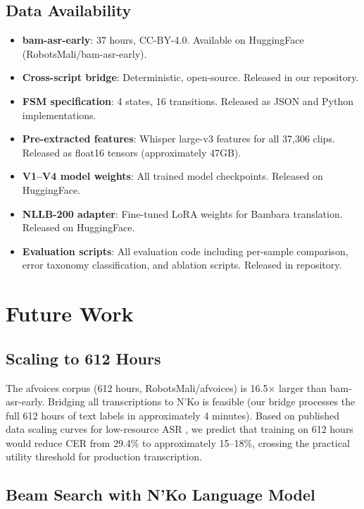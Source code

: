 \documentclass[11pt]{article}
\begin{document}
\subsection{Data Availability}

\begin{itemize}
\item \textbf{bam-asr-early}: 37 hours, CC-BY-4.0. Available on HuggingFace (RobotsMali/bam-asr-early).
\item \textbf{Cross-script bridge}: Deterministic, open-source. Released in our repository.
\item \textbf{FSM specification}: 4 states, 16 transitions. Released as JSON and Python implementations.
\item \textbf{Pre-extracted features}: Whisper large-v3 features for all 37,306 clips. Released as float16 tensors (approximately 47GB).
\item \textbf{V1--V4 model weights}: All trained model checkpoints. Released on HuggingFace.
\item \textbf{NLLB-200 adapter}: Fine-tuned LoRA weights for Bambara translation. Released on HuggingFace.
\item \textbf{Evaluation scripts}: All evaluation code including per-sample comparison, error taxonomy classification, and ablation scripts. Released in repository.
\end{itemize}

\section{Future Work}

\subsection{Scaling to 612 Hours}

The afvoices corpus (612 hours, RobotsMali/afvoices) is 16.5$\times$ larger than bam-asr-early.
Bridging all transcriptions to N'Ko is feasible (our bridge processes the full 612 hours of text labels in approximately 4 minutes).
Based on published data scaling curves for low-resource ASR \cite{data_scaling_2024}, we predict that training on 612 hours would reduce CER from 29.4\% to approximately 15--18\%, crossing the practical utility threshold for production transcription.

\subsection{Beam Search with N'Ko Language Model}
\end{document}
